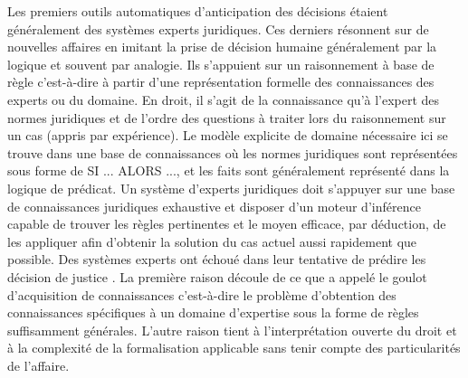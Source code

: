 Les premiers outils automatiques d'anticipation des décisions étaient généralement des systèmes experts juridiques. Ces derniers résonnent  sur de nouvelles affaires en imitant la prise de décision humaine généralement par la logique et souvent par analogie. Ils s'appuient sur un raisonnement à base de règle c'est-à-dire à partir d'une représentation formelle des connaissances des experts ou du domaine. En droit, il s'agit de la connaissance qu'à l'expert des normes juridiques et de l'ordre des questions à traiter lors du raisonnement sur un cas (appris par expérience). Le modèle explicite de domaine nécessaire ici se trouve dans une base de connaissances où les normes juridiques sont représentées sous forme de \og SI ... ALORS ...\fg{}, et les faits sont généralement représenté dans la logique de prédicat. Un système d’experts juridiques doit s’appuyer sur une base de connaissances juridiques exhaustive et disposer d’un moteur d’inférence capable de trouver les règles pertinentes et le moyen efficace, par déduction, de les appliquer afin d’obtenir la solution du cas actuel aussi rapidement que possible. Des systèmes experts ont échoué dans leur tentative de prédire les décision de justice \citep{leith2010risefall}. La première raison découle de ce que \citet{Berka2011rbr-cbr} a appelé le \og goulot d'acquisition de connaissances \fg{} c'est-à-dire le problème d'obtention des connaissances spécifiques à un domaine d’expertise sous la forme de règles suffisamment générales. L'autre raison tient à l'interprétation ouverte du droit et à la complexité de la formalisation applicable sans tenir compte des particularités de l'affaire.

